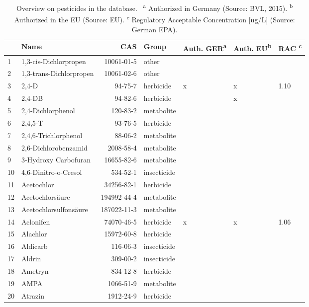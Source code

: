 \begingroup\fontsize{8pt}{10pt}\selectfont
\begin{longtable}{lp{3cm}rlp{0.5cm}p{0.5cm}p{1cm}}
\caption{Overview on pesticides in the database. \
                    \textsuperscript{a} Authorized in Germany (Source: BVL, 2015). 
                    \textsuperscript{b} Authorized in the EU (Source: EU).
                    \textsuperscript{c} Regulatory Acceptable Concentration [ug/L] (Source: German EPA).} \\ 
  \toprule
 & Name & CAS & Group & Auth. GER\textsuperscript{a} & Auth. EU\textsuperscript{b} & RAC \textsuperscript{c} \\ 
  \midrule
1 & 1,3-cis-Dichlorpropen & 10061-01-5 & other &  &  &  \\ 
  2 & 1,3-trans-Dichlorpropen & 10061-02-6 & other &  &  &  \\ 
  3 & 2,4-D & 94-75-7 & herbicide & x & x & 1.10 \\ 
  4 & 2,4-DB & 94-82-6 & herbicide &  & x &  \\ 
  5 & 2,4-Dichlorphenol & 120-83-2 & metabolite &  &  &  \\ 
  6 & 2,4,5-T & 93-76-5 & herbicide &  &  &  \\ 
  7 & 2,4,6-Trichlorphenol & 88-06-2 & metabolite &  &  &  \\ 
  8 & 2,6-Dichlorobenzamid & 2008-58-4 & metabolite &  &  &  \\ 
  9 & 3-Hydroxy Carbofuran & 16655-82-6 & metabolite &  &  &  \\ 
  10 & 4,6-Dinitro-o-Cresol & 534-52-1 & insecticide &  &  &  \\ 
  11 & Acetochlor & 34256-82-1 & herbicide &  &  &  \\ 
  12 & Acetochlorsäure & 194992-44-4 & metabolite &  &  &  \\ 
  13 & Acetochlorsulfonsäure & 187022-11-3 & metabolite &  &  &  \\ 
  14 & Aclonifen & 74070-46-5 & herbicide & x & x & 1.06 \\ 
  15 & Alachlor & 15972-60-8 & herbicide &  &  &  \\ 
  16 & Aldicarb & 116-06-3 & insecticide &  &  &  \\ 
  17 & Aldrin & 309-00-2 & insecticide &  &  &  \\ 
  18 & Ametryn & 834-12-8 & herbicide &  &  &  \\ 
  19 & AMPA & 1066-51-9 & metabolite &  &  &  \\ 
  20 & Atrazin & 1912-24-9 & herbicide &  &  &  \\ 

\end{longtable}
